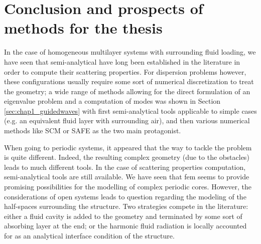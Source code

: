 \section{Conclusion and prospects of methods for the thesis}

In the case of homogeneous multilayer systems with surrounding fluid loading, we have seen that semi-analytical have long been established in the literature in order to compute their scattering properties. For dispersion problems however, these configurations usually require some sort of numerical discretization to treat the geometry; a wide range of methods allowing for the direct formulation of an eigenvalue problem and a computation of modes was shown in Section \ref{sec:chap1_guidedwaves} with first semi-analytical tools applicable to simple cases (e.g. an equivalent fluid layer with surrounding air), and then various numerical methods like SCM or SAFE as the two main protagonist.

When going to periodic systems, it appeared that the way to tackle the problem is quite different. Indeed, the resulting complex geometry (due to the obstacles) leads to much different tools. In the case of scattering properties computation, semi-analytical tools are still available. We have seen that \acrshort{fem} seems to provide promising possibilities for the modelling of complex periodic cores. However, the considerations of open systems leads to question regarding the modeling of the half-spaces surrounding the structure. Two strategies compete in the literature: either a fluid cavity is added to the geometry and terminated by some sort of absorbing layer at the end; or the harmonic fluid radiation is locally accounted for as an analytical interface condition of the structure. 